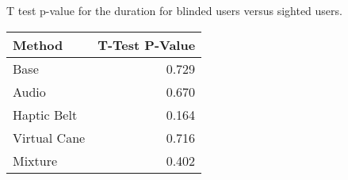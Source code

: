 
\centering
\caption{T test p-value for the duration for blinded users versus sighted users.}
\label{tab:ttest_duration}
\begin{tabular}{lr}
\toprule
      Method &  T-Test P-Value \\
\midrule
        Base &           0.729 \\
       Audio &           0.670 \\
 Haptic Belt &           0.164 \\
Virtual Cane &           0.716 \\
     Mixture &           0.402 \\
\bottomrule
\end{tabular}

